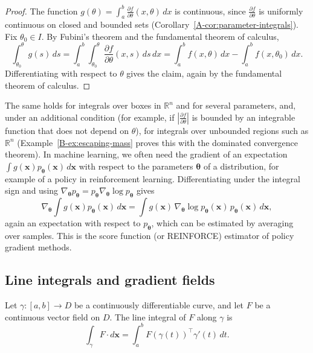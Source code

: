 \begin{proof}
    The function $g(\theta) = \int_a^b \frac{\partial f}{\partial\theta}(x, \theta)\, dx$ is continuous, since $\frac{\partial f}{\partial\theta}$ is uniformly continuous on closed and bounded sets (Corollary~\ref{A-cor:parameter-integrals}). Fix $\theta_0 \in I$. By Fubini's theorem and the fundamental theorem of calculus,
    \[\int_{\theta_0}^\theta g(s)\, ds = \int_a^b \int_{\theta_0}^\theta \frac{\partial f}{\partial\theta}(x, s)\, ds\, dx = \int_a^b f(x, \theta)\, dx - \int_a^b f(x, \theta_0)\, dx.\]
    Differentiating with respect to $\theta$ gives the claim, again by the fundamental theorem of calculus.
\end{proof}

The same holds for integrals over boxes in $\mathbb{R}^n$ and for several parameters, and, under an additional condition (for example, if $|\frac{\partial f}{\partial\theta}|$ is bounded by an integrable function that does not depend on $\theta$), for integrals over unbounded regions such as $\mathbb{R}^n$ (Example~\ref{B-ex:escaping-mass} proves this with the dominated convergence theorem). In machine learning, we often need the gradient of an expectation $\int g(\mathbf{x})p_{\boldsymbol{\theta}}(\mathbf{x})\, d\mathbf{x}$ with respect to the parameters $\boldsymbol{\theta}$ of a distribution, for example of a policy in reinforcement learning. Differentiating under the integral sign and using $\nabla_{\boldsymbol{\theta}}p_{\boldsymbol{\theta}} = p_{\boldsymbol{\theta}}\nabla_{\boldsymbol{\theta}}\log p_{\boldsymbol{\theta}}$ gives
\[\nabla_{\boldsymbol{\theta}}\int g(\mathbf{x})p_{\boldsymbol{\theta}}(\mathbf{x})\, d\mathbf{x} = \int g(\mathbf{x})\,\nabla_{\boldsymbol{\theta}}\log p_{\boldsymbol{\theta}}(\mathbf{x})\,p_{\boldsymbol{\theta}}(\mathbf{x})\, d\mathbf{x},\]
again an expectation with respect to $p_{\boldsymbol{\theta}}$, which can be estimated by averaging over samples. This is the score function (or REINFORCE) estimator of policy gradient methods.

\subsection{Line integrals and gradient fields}

\begin{definition}\label{L3-def:line-integral}
    Let $\gamma: [a, b] \to D$ be a continuously differentiable curve, and let $F$ be a continuous vector field on $D$. The line integral of $F$ along $\gamma$ is
    \[\int_\gamma F \cdot d\mathbf{x} = \int_a^b F(\gamma(t))^\top\gamma'(t)\, dt.\]
\end{definition}

